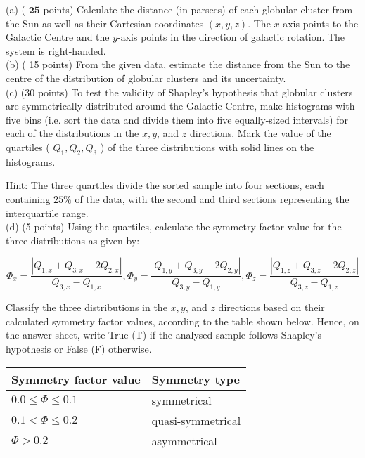 \documentclass[10pt]{article}
\begin{document}
(a) ( $\mathbf{2 5}$ points) Calculate the distance (in parsecs) of each globular cluster from the Sun as well as their Cartesian coordinates $(x, y, z)$. The $x$-axis points to the Galactic Centre and the $y$-axis points in the direction of galactic rotation. The system is right-handed.\\
(b) ( 15 points) From the given data, estimate the distance from the Sun to the centre of the distribution of globular clusters and its uncertainty.\\
(c) (30 points) To test the validity of Shapley's hypothesis that globular clusters are symmetrically distributed around the Galactic Centre, make histograms with five bins (i.e. sort the data and divide them into five equally-sized intervals) for each of the distributions in the $x, y$, and $z$ directions. Mark the value of the quartiles ( $Q_{1}, Q_{2}, Q_{3}$ ) of the three distributions with solid lines on the histograms.

Hint: The three quartiles divide the sorted sample into four sections, each containing $25 \%$ of the data, with the second and third sections representing the interquartile range.\\
(d) (5 points) Using the quartiles, calculate the symmetry factor value for the three distributions as given by:

$$
\Phi_{x}=\frac{\left|Q_{1, x}+Q_{3, x}-2 Q_{2, x}\right|}{Q_{3, x}-Q_{1, x}}, \Phi_{y}=\frac{\left|Q_{1, y}+Q_{3, y}-2 Q_{2, y}\right|}{Q_{3, y}-Q_{1, y}}, \Phi_{z}=\frac{\left|Q_{1, z}+Q_{3, z}-2 Q_{2, z}\right|}{Q_{3, z}-Q_{1, z}}
$$

Classify the three distributions in the $x, y$, and $z$ directions based on their calculated symmetry factor values, according to the table shown below. Hence, on the answer sheet, write True (T) if the analysed sample follows Shapley's hypothesis or False (F) otherwise.

\begin{center}
\begin{tabular}{|l|l|}
\hline
Symmetry factor value & Symmetry type \\
\hline
$0.0 \leq \Phi \leq 0.1$ & symmetrical \\
\hline
$0.1<\Phi \leq 0.2$ & quasi-symmetrical \\
\hline
$\Phi>0.2$ & asymmetrical \\
\hline
\end{tabular}
\end{center}
\end{document}
